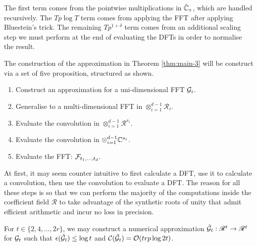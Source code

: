 The first term comes from the pointwise multiplications in $\tilde{{\mathbb C}}_\circ$, which are handled recursively. The $Tp \log T$ term comes from applying the FFT after applying Bluestein's trick. The remaining $Tp^{1 + \delta}$ term comes from an additional scaling step we must perform at the end of evaluating the DFTs in order to normalise the result.

The construction of the approximation in Theorem \ref{thm:main-3} will be construct via a set of five proposition, structured as shown.
\begin{enumerate}
    \item Construct an approximation for a uni-dimensional FFT $\mathcal G_i$.
    \item Generalise to a multi-dimensional FFT in $\otimes_{i=1}^{d-1} \mathscr{R}_i$.
    \item Evaluate the convolution in $\otimes_{i=1}^{d-1} \mathscr{R}^{s_i}$.
    \item Evaluate the convolution in $\otimes_{i=1}^{d-1} {\mathbb C}^{s_i}$.
    \item Evaluate the FFT: $\mathcal F_{t_1, \ldots, t_d}$.
\end{enumerate}

At first, it may seem counter intuitive to first calculate a DFT, use it to calculate a convolution, then use the convolution to evaluate a DFT. The reason for all these steps is so that we can perform the majority of the computations inside the coefficient field $\mathscr{R}$ to take advantage of the synthetic roots of unity that admit efficient arithmetic and incur no loss in precision.

\begin{lemma}\label{lem:first-lem}
    For $t \in \{2, 4, \ldots, 2r\}$, we may construct a numerical approximation $\tilde{\mathcal G}_t: \mathscr{R}^t \to \mathscr{R}^t$ for $\mathcal G_t$ such that $\epsilon (\tilde{\mathcal G}_t) \leq \log t$ and $\mathcal C(\tilde{\mathcal G}_t)= \mathcal O(trp \log 2t)$.
\end{lemma}

\medskip

